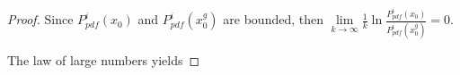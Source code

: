 \begin{proof}
		Since $P^i_{pdf}(x_0)$ and $P^i_{pdf}(x^g_0)$ are bounded, then $\lim\limits_{k\rightarrow \infty}\frac{1}{k}\ln\frac{P^i_{pdf}(x_0)}{P^i_{pdf}(x^g_0)}= 0.$
		
		The law of large numbers yields		
		

\end{proof}
